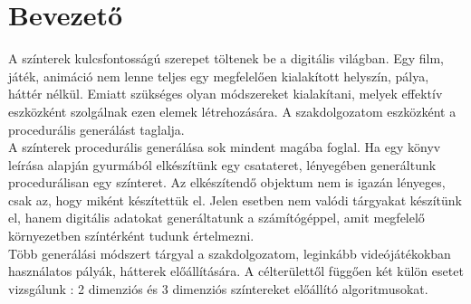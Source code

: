 \chapter{Bevezető}
A színterek kulcsfontosságú szerepet töltenek be a digitális világban. Egy film, játék, animáció nem lenne teljes egy megfelelően kialakított helyszín, pálya, háttér nélkül. Emiatt szükséges olyan módszereket kialakítani, melyek effektív eszközként szolgálnak ezen elemek létrehozására. A szakdolgozatom eszközként a procedurális generálást taglalja. \\
A színterek procedurális generálása sok mindent magába foglal. Ha egy könyv leírása alapján gyurmából elkészítünk egy csatateret, lényegében generáltunk procedurálisan egy színteret. Az elkészítendő objektum nem is igazán lényeges, csak az, hogy miként készítettük el. Jelen esetben nem valódi tárgyakat készítünk el, hanem digitális adatokat generáltatunk a számítógéppel, amit megfelelő környezetben színtérként tudunk értelmezni.\\
Több generálási módszert tárgyal a szakdolgozatom, leginkább videójátékokban használatos pályák, hátterek előállítására. A célterülettől függően két külön esetet vizsgálunk : 2 dimenziós és 3 dimenziós színtereket előállító algoritmusokat.